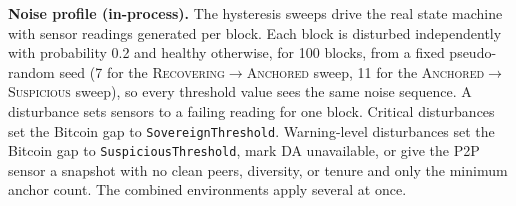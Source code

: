\textbf{Noise profile (in-process).} The hysteresis sweeps drive the real
state machine with sensor readings generated per block. Each block is
disturbed independently with probability 0.2 and healthy otherwise, for 100
blocks, from a fixed pseudo-random seed (7 for the
\textsc{Recovering}$\to$\textsc{Anchored} sweep, 11 for the
\textsc{Anchored}$\to$\textsc{Suspicious} sweep), so every threshold value
sees the same noise sequence. A disturbance sets sensors to a failing
reading for one block. Critical disturbances set the Bitcoin gap to
\texttt{SovereignThreshold}. Warning-level disturbances set the Bitcoin gap
to \texttt{SuspiciousThreshold}, mark DA unavailable, or give the P2P sensor
a snapshot with no clean peers, diversity, or tenure and only the minimum
anchor count. The combined environments apply several at once.

